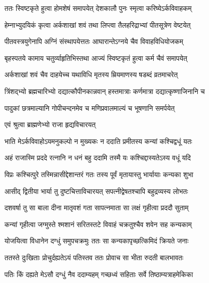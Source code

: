 \twolineshloka
{ततः स्विष्टकृते हुत्वा होमशेषं समापयेत्}
{देशकालौ पुनः स्मृत्वा करिष्येऽर्कविवाहकम्} %

\twolineshloka
{हेम्नाभ्युदयिकं कृत्वा अर्कशाखां शवं तथा}
{लिप्त्वा तैलहरिद्राभ्यां पीतसूत्रेण वेष्टयेत्} %

\twolineshloka
{पीतवस्त्रयुगेनापि अग्निं संस्थापयेत्ततः}
{आघारान्तेऽग्नये चैव विवाहविधियोजकम्} %

\twolineshloka
{बृहस्पतये कामाय चतुर्व्याहृतिभिस्तथा}
{आज्यं स्विष्टकृतं हुत्वा कर्म चैवं समापयेत्} %

\twolineshloka
{अर्कशाखां शवं चैव दाहयेच्च यथाविधि}
{मृतस्य म्रियमाणस्य षडब्दं व्रतमाचरेत्} %

\twolineshloka
{त्रिंशद्भ्यो ब्रह्मचारिभ्यो दद्यात्कौपीनकान्नवान्}
{हस्तमात्राः कर्णमात्रा दद्यात्कृष्णाजिनानि च} %

\twolineshloka
{पादुकां छत्रमाल्यानि गोपीचन्दनमेव च}
{मणिप्रवालमाल्यं च भूषणानि समर्पयेत्} %



\onelineshloka
{एवं श्रुत्वा ब्राह्मणेभ्यो राजा हृद्यविचारयत्} %

\twolineshloka
{भाति मेऽर्कविवाहोऽयमनुकल्पो न मुख्यकः}
{न ददाति प्रमीतस्य कन्यां कश्चिद्वधूं यतः} %

\twolineshloka
{अहं राजास्मि प्रददे रत्नानि न धनं बहु}
{ददामि तस्मै यः कश्चिद्दास्यतेऽस्य वधूं यदि} %

\twolineshloka
{विप्रः कश्चित्पुरे तस्मिन्नासीद्देशान्तरं गतः}
{तस्य पूर्वं मृतायास्तु भार्यायाः कन्यका शुभा} %

\twolineshloka
{आसीद् द्वितीया भार्या तु दुष्टचित्ताविचारयत्}
{सपत्नीद्वेषतश्चापि बहुद्रव्यस्य लोभतः} %

\twolineshloka
{दशवर्षा तु सा बाला दीना मातृवशं गता}
{सापत्नमाता सा लक्षं गृहीत्वा प्रददौ सुताम्} %

\twolineshloka
{कन्यां गृहीत्वा जग्मुस्ते श्मशानं सरितस्तटे}
{विवाहं चक्रतुश्चैव शवेन सह कन्यकाम्} %

\twolineshloka
{योजयित्वा विधानेन दग्धुं समुपचक्रमुः}
{ततः सा कन्यकापृच्छत्किमिदं क्रियते जनाः} %

\twolineshloka
{ततस्ते दुःखिताः प्रोचुर्दह्यतेऽयं पतिस्तव}
{ततः प्रोवाच सा भीता रुदती बालभावतः} %

\twolineshloka
{पतिः किं दह्यते मेऽसौ दग्धुं नैव ददाम्यहम्}
{गच्छध्वं सहिताः सर्वे तिष्ठाम्यत्राहमेकिका} %

